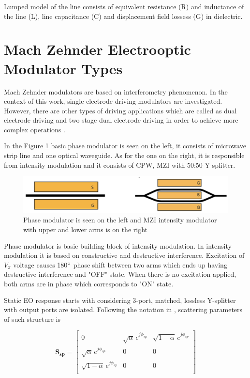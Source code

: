 \documentclass[thesis]{deutez}
\begin{document}
    Lumped model of the line consists of equivalent resistance (R) and inductance of the line (L), line capacitance (C) and displacement field lossess (G) in dielectric. 

    


    \section{Mach Zehnder Electrooptic Modulator Types}

    Mach Zehnder modulators are based on interferometry phenomenon. In the context of this work, single electrode driving modulators are investigated. However, there are other types of driving applications which are called as dual electrode driving and two stage dual electrode driving in order to achieve more complex operations \cite{20}. 

    In the Figure \ref{fig:modulator} basic phase modulator is seen on the left, it consists of microwave strip line and one optical waveguide. As for the one on the right, it is responsible from intensity modulation and it consists of CPW, MZI with 50:50 Y-splitter.
 
    \begin{figure}[h]
        \centering
        \includegraphics[width=0.8\linewidth]{Screenshot 2025-05-20 at 17.35.40.png}
        \caption{Phase modulator is seen on the left and MZI intensity modulator with upper and lower arms is on the right\cite{1}}
        \label{fig:modulator}
    \end{figure}

    Phase modulator is basic building block of intensity modulation. In intensity modulation it is based on constructive and destructive interference. Excitation of $V_\pi$ voltage causes 180$\degree$ phase shift between two arms which ends up having destructive interference and "OFF" state. When there is no excitation applied, both arms are in phase which corresponds to "ON" state.
    
    Static EO response starts with considering 3-port, matched, lossless Y-splitter with output ports are isolated. Following the notation in \cite{16}, scattering parameters of such structure is 

    \begin{equation}
        \bm{S_{sp}} =
        \begin{bmatrix}
            0 & \sqrt{\alpha}\,e^{j\phi_{sp}} & \sqrt{1-\alpha}\,e^{j\phi_{sp}}\\
            \sqrt{\alpha}\,e^{j\phi_{sp}} & 0 & 0 \\
            \sqrt{1-\alpha}\,e^{j\phi_{sp}} & 0 & 0\\
            
        \end{bmatrix}
        \label{eq:linear-el-opt-tensor}
    \end{equation}
\end{document}
